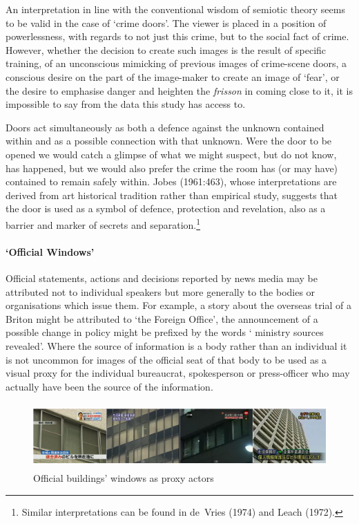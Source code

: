 An interpretation in line with the conventional wisdom of semiotic theory seems to be valid in the case of `crime doors'. The viewer is placed in a position of powerlessness, with regards to not just this crime, but to the social fact of crime. However, whether the decision to create such images is the result of specific training, of an unconscious mimicking of previous images of crime-scene doors, a conscious desire on the part of the image-maker to create an image of `fear', or the desire to emphasise danger and heighten the \textit{frisson} in coming close to it, it is impossible to say from the data this study has access to. 

Doors act simultaneously as both a defence against the unknown contained within and as a possible connection with that unknown. Were the door to be opened we would catch a glimpse of what we might suspect, but do not know, has happened, but we would also prefer the crime the room has (or may have) contained to remain safely within. Jobes (1961:463)\nocite{Jobes:1961}, whose interpretations are derived from art historical tradition rather than empirical study, suggests that the door is used as a symbol of defence, protection and revelation, also as a barrier and marker of secrets and separation.\footnote{Similar interpretations can be found in de~Vries (1974) and Leach (1972).\nocite{Leach:1972} \nocite{Vries:1974}} 

\paragraph{`Official Windows'}
Official statements, actions and decisions reported by news media may be attributed not to individual speakers but more generally to the bodies or organisations which issue them. For example, a story about the overseas trial of a Briton might be attributed to `the Foreign Office', the announcement of a possible change in policy might be prefixed by the words ` ministry sources revealed'. Where the  source of information is a body rather than an individual it is not uncommon for images of the official seat of that body to be used as a visual proxy for the individual bureaucrat, spokesperson or press-officer who may actually have been the source of the information. 

\begin{figure}
\centering
\includegraphics[height=2.5cm]{windows.jpg} 
\caption{Official buildings' windows as proxy actors}
\label{mont:windows}
\end{figure}

